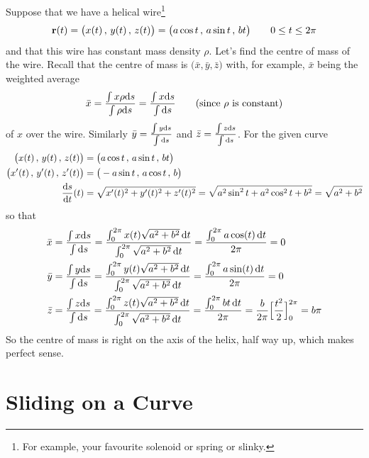 \begin{eg}\label{eg:CofMass}
Suppose that we have a helical wire\footnote{For example, your favourite
solenoid or spring or slinky.}
\begin{equation*}
\mathbf{r}(t) = \big(x(t)\,,\,y(t)\,,\,z(t)\big)
       =\big(a\cos t\,,\,a\sin t\,,\, bt\big)\qquad 0\le t\le 2\pi
\end{equation*}
and that this wire has constant mass density $\rho$.
Let's find the centre of mass of the wire. Recall that the centre of mass
is $\big(\bar x,\bar y,\bar z)$ with, for example, $\bar x$ being the
weighted average 
\begin{equation*}
\bar x = \frac{\int x\rho \mathrm{d}s}{\int \rho\mathrm{d}s}
= \frac{\int x \mathrm{d}s}{\int \mathrm{d}s}
\qquad\text{(since $\rho$ is constant)}
\end{equation*}
of $x$ over the wire. Similarly
$
\bar y = \frac{\int y \mathrm{d}s}{\int \mathrm{d}s}
$
and
$
\bar z = \frac{\int z \mathrm{d}s}{\int \mathrm{d}s}
$.
For the given curve
\begin{align*}
 \big(x(t)\,,\,y(t)\,,\,z(t)\big) &=\big(a\cos t\,,\,a\sin t\,,\, bt\big) \\
 \big(x'(t)\,,\,y'(t)\,,\,z'(t)\big) &=\big(-a\sin t\,,\,a\cos t\,,\, b\big) \\
\diff{s}{t}(t) &=\sqrt{x'(t)^2+y'(t)^2+z'(t)^2}
                  =\sqrt{a^2\sin^2t+a^2\cos^2t+b^2}
                  =\sqrt{a^2+b^2}
\end{align*}
so that
\begin{align*}
\bar x
&= \frac{\int x \mathrm{d}s}{\int \mathrm{d}s}
= \frac{\int_0^{2\pi} x(t) \sqrt{a^2+b^2}\,\mathrm{d}t}
          {\int_0^{2\pi} \sqrt{a^2+b^2}\,\mathrm{d}t}
= \frac{\int_0^{2\pi} a\cos(t) \,\mathrm{d}t}{2\pi}
=0
\\
\bar y
&= \frac{\int y \mathrm{d}s}{\int \mathrm{d}s}
= \frac{\int_0^{2\pi} y(t) \sqrt{a^2+b^2}\,\mathrm{d}t}
       {\int_0^{2\pi} \sqrt{a^2+b^2}\,\mathrm{d}t}
= \frac{\int_0^{2\pi} a\sin(t) \,\mathrm{d}t}{2\pi}
=0\\
\bar z
&= \frac{\int z \mathrm{d}s}{\int \mathrm{d}s}
= \frac{\int_0^{2\pi} z(t) \sqrt{a^2+b^2}\,\mathrm{d}t}
      {\int_0^{2\pi} \sqrt{a^2+b^2}\,\mathrm{d}t}
= \frac{\int_0^{2\pi} bt \,\mathrm{d}t}{2\pi}
=\frac{b}{2\pi}\Big[\frac{t^2}{2}\Big]_0^{2\pi}
=b\pi
\end{align*}
So the centre of mass is right on the axis of the helix, half way up,
which makes perfect sense. 
\end{eg}


\section{Sliding on a Curve}\label{sec:Sliding}

